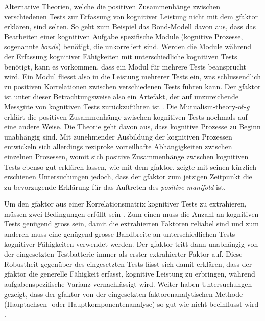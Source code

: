 \documentclass[11pt, twoside, a4paper]{book}		%
\begin{document}
Alternative Theorien, welche die positiven Zusammenhänge zwischen verschiedenen Tests zur Erfassung von kognitiver Leistung nicht mit dem \gls{gfaktor} erklären, sind selten. 
So geht zum Beispiel das Bond-Modell \citep{Thomson1916} davon aus, dass das Bearbeiten einer kognitiven Aufgabe spezifische Module (kognitive Prozesse, sogenannte \textit{bonds}) benötigt, die unkorreliert sind. Werden die Module während der Erfassung kognitiver Fähigkeiten mit unterschiedliche kognitiven Tests benötigt, kann es vorkommen, dass ein Modul für mehrere Tests beansprucht wird. Ein Modul fliesst also in die Leistung mehrerer Tests ein, was schlussendlich zu positiven Korrelationen zwischen verschiedenen Tests führen kann. Der \gls{gfaktor} ist unter dieser Betrachtungsweise also ein Artefakt, der auf unzureichende Messgüte von kognitiven Tests zurückzuführen ist \citep[für einen Gegenüberstellung zwischen dem \gls{gfaktor} und dem Bond-Modell siehe][]{Bartholomew2013}.
Die Mutualism-theory-of-\textit{g} \citep{VanDerMaas2006} erklärt die positiven Zusammenhänge zwischen kognitiven Tests nochmals auf eine andere Weise. Die Theorie geht davon aus, dass kognitive Prozesse zu Beginn unabhängig sind. Mit zunehmender Ausbildung der kognitiven Prozessen entwickeln sich allerdings reziproke vorteilhafte Abhängigkeiten zwischen einzelnen Prozessen, womit sich positive Zusammenhänge zwischen kognitiven Tests ebenso gut erklären lassen, wie mit dem \gls{gfaktor}. \citet{Gignac2014, Gignac2016} zeigte mit seinen kürzlich erschienen Untersuchungen jedoch, dass der \gls{gfaktor} zum jetzigen Zeitpunkt die zu bevorzugende Erklärung für das Auftreten des \textit{positive man\-i\-fold} ist. 

Um den \gls{gfaktor} aus einer Korrelationsmatrix kognitiver Tests zu extrahieren, müssen zwei Bedingungen erfüllt sein \citep[][S. 73]{Jensen1998b}. Zum einen muss die Anzahl an kognitiven Tests genügend gross sein, damit die extrahierten Faktoren reliabel sind und zum anderen muss eine genügend grosse Bandbreite an unterschiedlichen Tests kognitiver Fähigkeiten verwendet werden. Der \gls{gfaktor} tritt dann unabhängig von der eingesetzten Testbatterie \citep{Johnson2004, Johnson2008} immer als erster extrahierter Faktor auf. Diese Robustheit gegenüber des eingesetzten Tests lässt sich damit erklären, dass der \gls{gfaktor} die generelle Fähigkeit erfasst, kognitive Leistung zu erbringen, während aufgabenspezifische Varianz vernachlässigt wird. Weiter haben Untersuchungen gezeigt, dass der \gls{gfaktor} von der eingesetzten faktorenanalytischen Methode (Hauptachsen- oder Hauptkomponentenanalyse) so gut wie nicht beeinflusst wird \citep{Jensen1994, Ree1991}.
\end{document}
